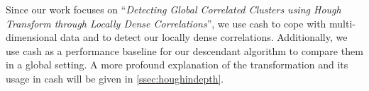Since our work focuses on ``\textit{Detecting Global Correlated Clusters using Hough Transform through Locally Dense Correlations}'', we use \gls{cash} to cope with multi-dimensional data and to detect our locally dense correlations. Additionally, we use \gls{cash} as a performance baseline for our descendant algorithm to compare them in a global setting.
A more profound explanation of the transformation and its usage in \gls{cash} will be given in \autoref{ssec:houghindepth}.

\begin{table}[]
\centering
{}
\end{table}
